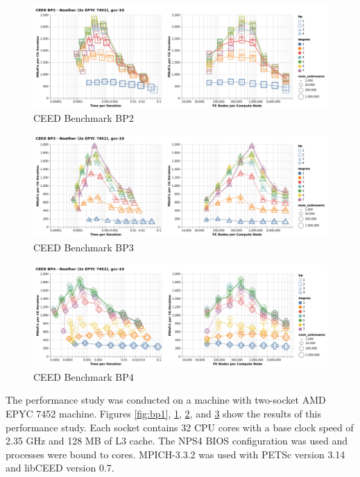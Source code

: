 \begin{figure}[ht!]
\includegraphics[width=.99\linewidth]{../img/xsmmBlockedBP2Clip}
\caption{CEED Benchmark BP2}
\label{fig:bp2}
\end{figure}

\begin{figure}[ht!]
\includegraphics[width=.99\linewidth]{../img/xsmmBlockedBP3Clip}
\caption{CEED Benchmark BP3}
\label{fig:bp3}
\end{figure}

\begin{figure}[ht!]
\includegraphics[width=.99\linewidth]{../img/xsmmBlockedBP4Clip}
\caption{CEED Benchmark BP4}
\label{fig:bp4}
\end{figure}

The performance study was conducted on a machine with two-socket AMD EPYC 7452 machine.
Figures \ref{fig:bp1}, \ref{fig:bp2}, \ref{fig:bp3}, and \ref{fig:bp4} show the results of this performance study.
Each socket contains 32 CPU cores with a base clock speed of 2.35 GHz and 128 MB of L3 cache.
The NPS4 BIOS configuration was used and processes were bound to cores.
MPICH-3.3.2 was used with PETSc \cite{petsc-user-ref} version 3.14 and libCEED \cite{libceed} version 0.7.

